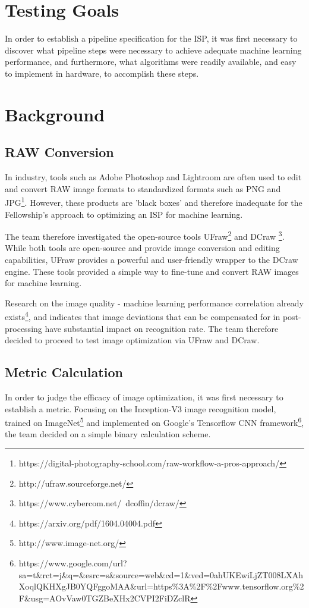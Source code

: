 \documentclass{report}
\begin{document}
	\section{Testing Goals}
	In order to establish a pipeline specification for the ISP, it was first necessary to discover what pipeline steps were necessary to achieve adequate machine learning performance, and furthermore, what algorithms were readily available, and easy to implement in hardware, to accomplish these steps.
	\section{Background}
		\subsection{RAW Conversion}
		In industry, tools such as Adobe Photoshop and Lightroom are often used to edit and convert RAW image formats to standardized formats such as PNG and JPG\footnote{https://digital-photography-school.com/raw-workflow-a-pros-approach/}. However, these products are 'black boxes' and therefore inadequate for the Fellowship's approach to optimizing an ISP for machine learning.
		
		The team therefore investigated the open-source tools UFraw\footnote{http://ufraw.sourceforge.net/} and DCraw \footnote{https://www.cybercom.net/~dcoffin/dcraw/}. While both tools are open-source and provide image conversion and editing capabilities, UFraw provides a powerful and user-friendly wrapper to the DCraw engine. These tools provided a simple way to fine-tune and convert RAW images for machine learning. 
		
		Research on the image quality - machine learning performance correlation already exists\footnote{https://arxiv.org/pdf/1604.04004.pdf}, and indicates that image deviations that can be compensated for in post-processing have substantial impact on recognition rate. The team therefore decided to proceed to test image optimization via UFraw and DCraw.
		\subsection{Metric Calculation}
		In order to judge the efficacy of image optimization, it was first necessary to establish a metric. Focusing on the Inception-V3 image recognition model, trained on ImageNet\footnote{http://www.image-net.org/} and implemented on Google's Tensorflow CNN framework\footnote{https://www.google.com/url?sa=t\&rct=j\&q=\&esrc=s\&source=web\&cd=1\&ved=0ahUKEwiLjZT008LXAhXoqlQKHXgJB0YQFggoMAA\&url=https\%3A\%2F\%2Fwww.tensorflow.org\%2F\&usg=AOvVaw0TGZBeXHx2CVPI2FiDZclR}, the team decided on a simple binary calculation scheme.
		
\end{document}
